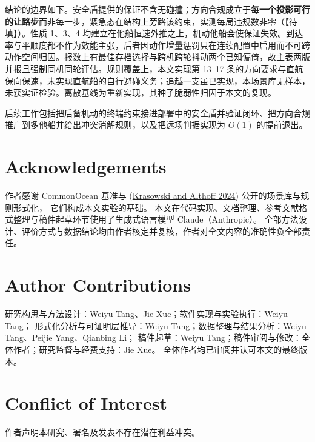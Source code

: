 \documentclass[12pt,letterpaper]{article}
\newcommand{\citl}[2]{(\hyperlink{ref:#1}{#2})}
\newcommand{\TBD}{【待填】}
\begin{document}
结论的边界如下。安全盾提供的保证不含无碰撞；方向合规成立于\textbf{每一个投影可行的让路步}而非每一步，紧急态在结构上旁路该约束，实测每局违规数非零（\TBD）。性质 1、3、4 均建立在他船恒速外推之上，机动他船会使保证失效。到达率与平顺度都不作为效能主张，后者因动作增量惩罚只在连续配置中启用而不可跨动作空间归因。报数上有最佳存档选择与跨机跨轮抖动两个已知偏倚，故主表两版并报且强制同机同轮评估。规则覆盖上，本文实现第 13--17 条的方向要求与直航保向保速，未实现直航船的自行避碰义务；追越一支虽已实现，本场景库无样本，未获实证检验。离散基线为重新实现，其种子脆弱性归因于本文的复现。

后续工作包括把后备机动的终端约束接进部署中的安全盾并验证闭环、把方向合规推广到多他船并给出冲突消解规则，以及把远场判据实现为 $O(1)$ 的提前退出。


\section*{Acknowledgements}
作者感谢 CommonOcean 基准与 \citl{krasowski2024}{Krasowski and Althoff 2024} 公开的场景库与规则形式化，
它们构成本文实验的基础。
本文在代码实现、文档整理、参考文献格式整理与稿件起草环节使用了生成式语言模型 Claude（Anthropic）。
全部方法设计、评价方式与数据结论均由作者核定并复核，作者对全文内容的准确性负全部责任。

\section*{Author Contributions}
研究构思与方法设计：Weiyu Tang、Jie Xue；软件实现与实验执行：Weiyu Tang；
形式化分析与可证明层推导：Weiyu Tang；数据整理与结果分析：Weiyu Tang、Peijie Yang、Qianbing Li；
稿件起草：Weiyu Tang；稿件审阅与修改：全体作者；研究监督与经费支持：Jie Xue。
全体作者均已审阅并认可本文的最终版本。

\section*{Conflict of Interest}
作者声明本研究、署名及发表不存在潜在利益冲突。
\end{document}
